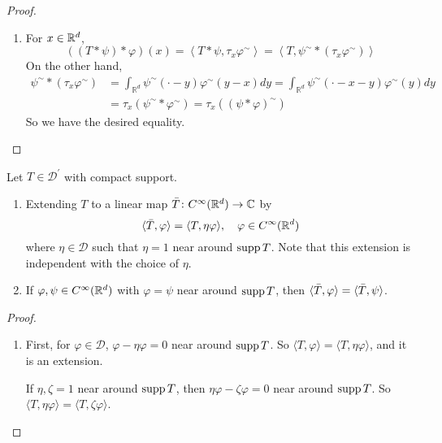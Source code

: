 \begin{enumerate}[label=\arabic*.]
\begin{proof}
\begin{enumerate}
			\item For $x \in \mathbb{R}^d$,
			\begin{equation*}
				((T * \psi) * \varphi)(x)=\left\langle T * \psi, \tau_x \varphi^{\sim}\right\rangle=\left\langle T, \psi^{\sim} *\left(\tau_x \varphi^{\sim}\right)\right\rangle
			\end{equation*}
			On the other hand,
			\begin{equation*}
				\begin{aligned}
					\psi^{\sim} *\left(\tau_x \varphi^{\sim}\right) & =\int_{\mathbb{R}^d} \psi^{\sim}(\cdot-y) \varphi^{\sim}(y-x) d y=\int_{\mathbb{R}^d} \psi^{\sim}(\cdot-x-y) \varphi^{\sim}(y) d y \\
					& =\tau_x\left(\psi^{\sim} * \varphi^{\sim}\right)=\tau_x\left((\psi * \varphi)^{\sim}\right)
				\end{aligned}
			\end{equation*}
			So we have the desired equality.
		\end{enumerate}
	\end{proof}

	\begin{prop}
		Let $T \in \mathcal{D}^\prime$ with compact support.
		\begin{enumerate}[label=(\arabic{*})]
			\item Extending $T$ to a linear map $\bar{T} \colon C^\infty(\mathbb{R}^d) \rightarrow \mathbb{C}$ by
			\begin{equation*}
				\langle \bar{T},\varphi \rangle = \langle T,\eta \varphi \rangle,\quad \varphi \in C^\infty(\mathbb{R}^d)
			\end{equation*}
			where $\eta \in \mathcal{D}$ such that $\eta = 1$ near around $\operatorname{supp} T$. Note that this extension is independent with the choice of $\eta$.

			\item If $\varphi,\psi \in C^\infty(\mathbb{R}^d)$ with $\varphi = \psi$ near around $\operatorname{supp} T$, then $\langle \bar{T},\varphi \rangle = \langle \bar{T},\psi \rangle$.
		\end{enumerate}
	\end{prop}
	\begin{proof}
		\begin{enumerate}
			\item First, for $\varphi \in \mathcal{D}$, $\varphi - \eta \varphi = 0$ near around $\operatorname{supp} T$. So $\langle T, \varphi\rangle=\langle T, \eta \varphi\rangle$, and it is an extension.

			\noindent If $\eta, \zeta = 1$ near around $\operatorname{supp} T$, then $\eta \varphi-\zeta \varphi = 0$ near around $\operatorname{supp} T$. So $\langle T, \eta \varphi\rangle=\langle T, \zeta \varphi\rangle$.


\end{enumerate}
\end{proof}
\end{enumerate}
